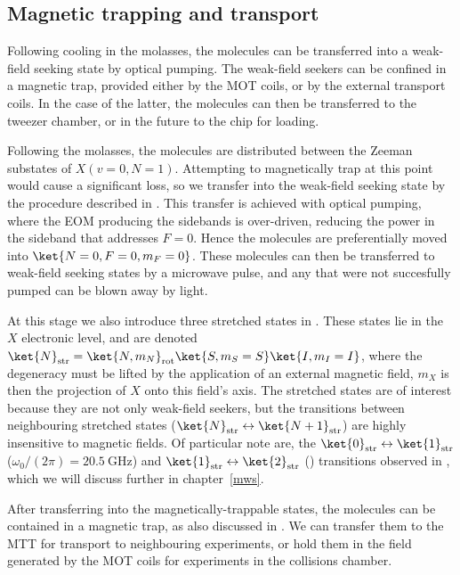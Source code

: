 \subsection*{Magnetic trapping and transport}


Following cooling in the molasses, the molecules can be transferred into a
weak-field seeking state by optical pumping. The weak-field seekers can be
confined in a magnetic trap, provided either by the MOT coils, or by the
external transport coils. In the case of the latter, the molecules can then be
transferred to the tweezer chamber, or in the future to the chip for loading.

Following the molasses, the molecules are distributed between the Zeeman
substates of $X(v=0, N=1)$. Attempting to magnetically trap at this point would
cause a significant loss, so we transfer into the weak-field seeking state by
the procedure described in . This transfer is
achieved with optical pumping, where the EOM producing the 
sidebands is over-driven, reducing the power in the sideband that addresses
$F=0$. Hence the molecules are preferentially moved into $\ket{N=0, F=0,
m_F=0}$. These molecules can then be transferred to weak-field seeking states
by a microwave pulse, and any that were not succesfully pumped can be blown
away by  light.

At this stage we also introduce three stretched states in \CaF{}. These states
lie in the $X$ electronic level, and are denoted $\ket{N}_\text{str} = \ket{N,
m_N}_\text{rot}\ket{S, m_S=S}\ket{I,m_I=I}$, where the degeneracy must be
lifted by the application of an external magnetic field, $m_X$ is then the
projection of $X$ onto this field's axis. The stretched states are of interest
because they are not only weak-field seekers, but the transitions between
neighbouring stretched states
($\ket{N}_\text{str}\leftrightarrow\ket{N+1}_\text{str}$) are highly
insensitive to magnetic fields. Of particular note are, the
$\ket{0}_\text{str}\leftrightarrow\ket{1}_\text{str}$ ($\omega_0/(2\pi) =
\SI{20.5}{\giga\hertz}$) and
$\ket{1}_\text{str}\leftrightarrow\ket{2}_\text{str}$ () transitions observed in , which we will discuss further in chapter~\ref{mws}.

After transferring into the magnetically-trappable states, the molecules
can be contained in a magnetic trap, as also discussed in \inlineref{}. We can
transfer them to the MTT for transport to neighbouring experiments, or hold
them in the field generated by the MOT coils for experiments in the collisions
chamber.

